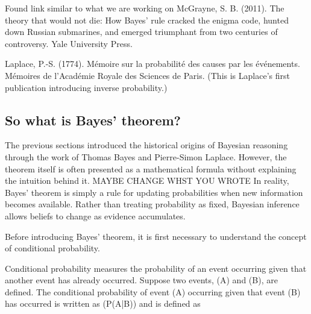 Found link similar to what we are working on 
McGrayne, S. B. (2011). The theory that would not die: How Bayes' rule cracked the enigma code, hunted down Russian submarines, and emerged triumphant from two centuries of controversy. Yale University Press.

Laplace, P.-S. (1774). Mémoire sur la probabilité des causes par les événements. Mémoires de l'Académie Royale des Sciences de Paris. (This is Laplace's first publication introducing inverse probability.)





\subsection{So what is Bayes' theorem?} 

The previous sections introduced the historical origins of Bayesian reasoning through the work of Thomas Bayes and Pierre-Simon Laplace. However, the theorem itself is often presented as a mathematical formula without explaining the intuition behind it. 
MAYBE CHANGE WHST YOU WROTE
In reality, Bayes' theorem is simply a rule for updating probabilities when new information becomes available. Rather than treating probability as fixed, Bayesian inference allows beliefs to change as evidence accumulates.

Before introducing Bayes' theorem, it is first necessary to understand the concept of conditional probability.

Conditional probability measures the probability of an event occurring given that another event has already occurred. Suppose two events, (A) and (B), are defined. The conditional probability of event (A) occurring given that event (B) has occurred is written as (P(A|B)) and is defined as
\begin{equation}
[
P(A|B)=\frac{P(A\cap B)}{P(B)}.
]
\end{equation}


